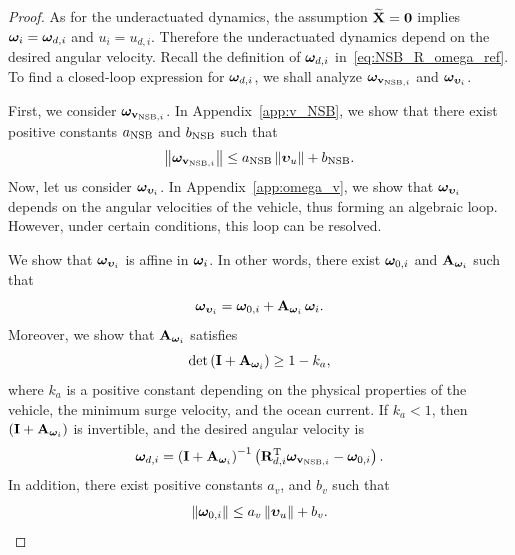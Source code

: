 \begin{proof}
    

    As for the underactuated dynamics, the assumption $\widetilde{\mathbf{X}} = \mathbf{0}$ implies $\bm{\omega}_i = \bm{\omega}_{d, i}$ and $u_i = u_{d, i}$.
    Therefore the underactuated dynamics depend on the desired angular velocity.
    Recall the definition of $\bm{\omega}_{d, i}$ in~\eqref{eq:NSB_R_omega_ref}.
    To find a closed-loop expression for $\bm{\omega}_{d, i}$, we shall analyze $\bm{\omega}_{\mathbf{v}_{{\rm NSB}, i}}$ and $\bm{\omega}_{\bm{\upsilon}_{i}}$.

    
    
    First, we consider $\bm{\omega}_{\mathbf{v}_{{\rm NSB}, i}}$.
    In Appendix~\ref{app:v_NSB}, we show that there exist positive constants $a_{\rm NSB}$ and $b_{\rm NSB}$ such that 
    \begin{equation}
        \left\|\bm{\omega}_{\mathbf{v}_{{\rm NSB}, i}}\right\| \leq a_{\rm NSB}\left\|\bm{\upsilon}_u\right\| + b_{\rm NSB}.
        \label{eq:NSB_R_omega_NSB_bound}
    \end{equation}
    Now, let us consider $\bm{\omega}_{\bm{\upsilon}_i}$.
    In Appendix~\ref{app:omega_v}, we show that $\bm{\omega}_{\bm{\upsilon}_i}$ depends on the angular velocities of the vehicle, thus forming an algebraic loop.
    However, under certain conditions, this loop can be resolved.

    

    We show that $\bm{\omega}_{\bm{\upsilon}_{i}}$ is affine in $\bm{\omega}_i$.
    In other words, there exist $\bm{\omega}_{0, i}$ and $\mathbf{A}_{\bm{\omega}_i}$ such that \vspace*{-0.35em}
    \begin{equation}
        \bs{\omega}_{\bvel_{i}} = \bs{\omega}_{0, i} + \mat{A}_{\bs{\omega}_i}\,\bs{\omega}_i.
        \vspace*{-0.15em}
    \end{equation}
    Moreover, we show that $\mathbf{A}_{\bm{\omega}_i}$ satisfies 
    \begin{equation}
        \det\left(\mat{I} + \mat{A}_{\bs{\omega}_i}\right) \geq 1 - k_a,
        \label{eq:NSB_R_det_A_bound}
        \vspace*{-0.25em}
    \end{equation}
    where $k_a$ is a positive constant depending on the physical properties of the vehicle, the minimum surge velocity, and the ocean current.
    If $k_a < 1$, then $\left(\mathbf{I} + \mathbf{A}_{\bm{\omega}_i}\right)$ is invertible, and the desired angular velocity is 
    \begin{equation}
        \bm{\omega}_{d, i} = \left(\mathbf{I} + \mathbf{A}_{\bm{\omega}_i}\right)^{-1}\left(\mathbf{R}_{d, i}^{\mathrm{T}} \bm{\omega}_{\mathbf{v}_{{\rm NSB}, i}} - \bm{\omega}_{0, i}\right).
    \end{equation}
    In addition, there exist positive constants $a_v$, and $b_v$ such that 
    \begin{equation}
        \left\|\bm{\omega}_{0, i}\right\| \leq a_v\left\|\bm{\upsilon}_u\right\| + b_v.
        \label{eq:NSB_R_omega_0_bound}
    \end{equation}


\end{proof}
